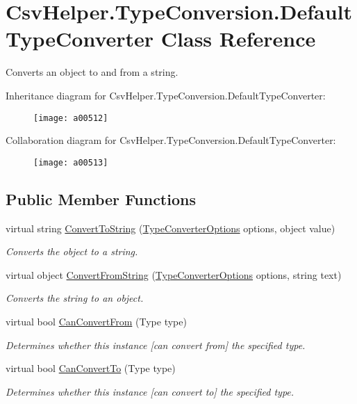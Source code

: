 \hypertarget{a00078}{\section{Csv\-Helper.\-Type\-Conversion.\-Default\-Type\-Converter Class Reference}
\label{a00078}
}


Converts an object to and from a string.  




Inheritance diagram for Csv\-Helper.\-Type\-Conversion.\-Default\-Type\-Converter\-:
\nopagebreak
\begin{figure}[H]
\begin{center}
\leavevmode
\texttt{[image: a00512]}
\end{center}
\end{figure}


Collaboration diagram for Csv\-Helper.\-Type\-Conversion.\-Default\-Type\-Converter\-:
\nopagebreak
\begin{figure}[H]
\begin{center}
\leavevmode
\texttt{[image: a00513]}
\end{center}
\end{figure}
\subsection*{Public Member Functions}
\begin{DoxyCompactItemize}
\item 
virtual string \hyperlink{a00078_a36cb2f9b24f15a671293f3a722324c27}{Convert\-To\-String} (\hyperlink{a00168}{Type\-Converter\-Options} options, object value)
\begin{DoxyCompactList}\small\item\em Converts the object to a string. \end{DoxyCompactList}\item 
virtual object \hyperlink{a00078_a804ea00060e1de70e5151f90d3bfce9b}{Convert\-From\-String} (\hyperlink{a00168}{Type\-Converter\-Options} options, string text)
\begin{DoxyCompactList}\small\item\em Converts the string to an object. \end{DoxyCompactList}\item 
virtual bool \hyperlink{a00078_a470d21adaa704eb281250dbd112ff91a}{Can\-Convert\-From} (Type type)
\begin{DoxyCompactList}\small\item\em Determines whether this instance \mbox{[}can convert from\mbox{]} the specified type. \end{DoxyCompactList}\item 
virtual bool \hyperlink{a00078_acb65bd8c8199d88d5b1629ae35d18514}{Can\-Convert\-To} (Type type)
\begin{DoxyCompactList}\small\item\em Determines whether this instance \mbox{[}can convert to\mbox{]} the specified type. \end{DoxyCompactList}\end{DoxyCompactItemize}


